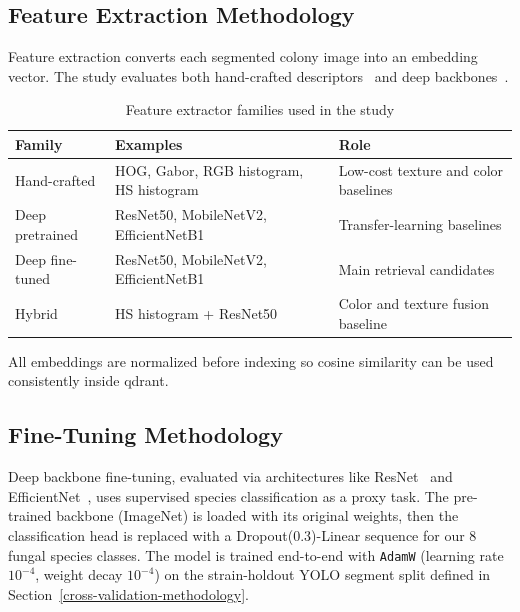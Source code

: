 \subsection{Feature Extraction Methodology}\label{feature-extraction-methodology}

Feature extraction converts each segmented colony image into an embedding vector. The study evaluates both hand-crafted descriptors~\cite{dalal2005hog,ouhanoun1998gabor,haralick1973texture} and deep backbones~\cite{he2016resnet,tan2019efficientnet,sandler2018mobilenetv2}.

\begin{table}[ht]
\centering
\caption{Feature extractor families used in the study}
\begin{tabularx}{\textwidth}{@{}p{3cm}X X@{}}
\toprule
\textbf{Family} & \textbf{Examples} & \textbf{Role} \\
\midrule
Hand-crafted & HOG, Gabor, RGB histogram, HS histogram & Low-cost texture and color baselines \\
Deep pretrained & ResNet50, MobileNetV2, EfficientNetB1 & Transfer-learning baselines \\
Deep fine-tuned & ResNet50, MobileNetV2, EfficientNetB1 & Main retrieval candidates \\
Hybrid & HS histogram + ResNet50 & Color and texture fusion baseline \\
\bottomrule
\end{tabularx}
\end{table}

All embeddings are normalized before indexing so cosine similarity can be used consistently inside \gls{qdrant}.

\subsection{Fine-Tuning Methodology}\label{fine-tuning-methodology}

Deep backbone fine-tuning, evaluated via architectures like ResNet~\cite{he2016resnet} and EfficientNet~\cite{tan2019efficientnet}, uses supervised species classification as a proxy task. The pre-trained backbone (ImageNet) is loaded with its original weights, then the classification head is replaced with a Dropout(0.3)-Linear sequence for our 8 fungal species classes. The model is trained end-to-end with \texttt{AdamW} (learning rate $10^{-4}$, weight decay $10^{-4}$) on the strain-holdout YOLO segment split defined in Section~\ref{cross-validation-methodology}.

